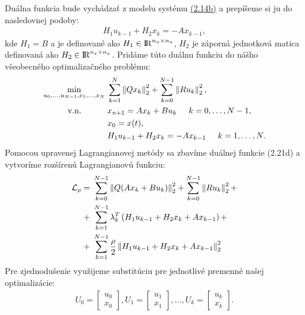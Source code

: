 Duálna funkcia bude vychádzať z modelu systému \hyperref[math:2.14]{(2.14b)} a prepíšeme si ju do nasledovnej podoby:
\begin{align}
	H_{1}u_{k-1} + H_{2}x_{k} = -Ax_{k-1},
\end{align}
kde $H_{1} = B$ a je definované ako $H_{1} \in {\rm I\!R}^{n_{u}\times n_{u}}$, $H_{2}$ je záporná jednotková matica definovaná ako $H_{2} \in {\rm I\!R}^{n_{x}\times n_{x}}$. Pridáme túto duálnu funkciu do nášho všeobecného optimalizačného problému:
\begin{subequations}
	\begin{align}
		\displaystyle \min_{u_0,...,u_{N-1},x_1,...,x_N} \hspace{0.1cm} & 
		\sum_{k=1}^{N}
		\left\lVert Qx_k\right\rVert^{2}_{2}+\sum_{k=0}^{N-1}\left\lVert Ru_k\right\rVert^{2}_{2},\\
		\textrm{v.n.} \hspace{1.1cm} & x_{n+1} = Ax_{k}+Bu_{k} \hspace{0.5cm} k=0,\dots,N-1,\\
		& x_{0} = x(t),\\
		&H_{1}u_{k-1} + H_{2}x_{k} = -Ax_{k-1}\hspace{0.5cm} k=1,\dots,N.
	\end{align}
\end{subequations}
Pomocou upravenej Lagrangianovej metódy sa zbavíme duálnej funkcie (2.21d) a vytvoríme rozšírenú Lagrangianovú funkciu:
\label{math:RozsirenyLag}
\begin{equation}
\begin{split}
\mathcal{L}_{\rho} =&~ \sum_{k=0}^{N-1}\left\lVert Q(Ax_{k}+Bu_{k})\right\rVert^{2}_{2}+\sum_{k=0}^{N-1}\left\lVert Ru_k\right\rVert^{2}_{2} +\\+&~\sum_{k=1}^{N-1}\lambda_{k}^{T}\left(  H_{1}u_{k-1} + H_{2}x_{k} + Ax_{k-1}\right) +\\+&~\sum_{k=1}^{N-1}\frac{\rho}{2} \left\lVert H_{1}u_{k-1} + H_{2}x_{k} + Ax_{k-1}\right\rVert_{2}^{2}
\end{split}
\end{equation}
Pre zjednodušenie využijeme substitúciu pre jednotlivé premenné našej optimalizácie:
\begin{align}
	U_{0} =\begin{bmatrix}
	u_{0}\\
	x_{0}
	\end{bmatrix},
	U_{1} =\begin{bmatrix}
	u_{1}\\
	x_{1}
	\end{bmatrix}, \dots ,
	U_{k} =\begin{bmatrix}
	u_{k}\\
	x_{k}
	\end{bmatrix}.
\end{align}
